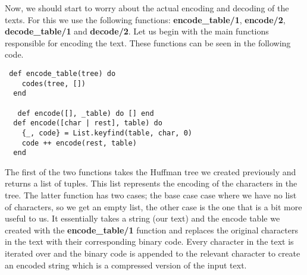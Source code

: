 \documentclass[a4paper,11pt]{article}
\begin{document}
Now, we should start to worry about the actual encoding and decoding of the texts. For this we use the following functions: \textbf{encode\_table/1}, \textbf{encode/2}, \textbf{decode\_table/1} and \textbf{decode/2}. Let us begin with the main functions responsible for encoding the text.
These functions can be seen in the following code.
\begin{verbatim}
 def encode_table(tree) do
    codes(tree, [])
  end
  
   def encode([], _table) do [] end
  def encode([char | rest], table) do
    {_, code} = List.keyfind(table, char, 0)
    code ++ encode(rest, table)
  end
\end{verbatim}
The first of the two functions takes the Huffman tree we created previously and returns a list of tuples. This list represents the encoding of the characters in the tree. The latter function has two cases; the base case case where we have no list of characters, so we get an empty list, the other case is the one that is a bit more useful to us. It essentially takes a string (our text) and the encode table we created with the \textbf{encode\_table/1} function and replaces the original characters in the text with their corresponding binary code. Every character in the text is iterated over and the binary code is appended to the relevant character to create an encoded string which is a compressed version of the input text.\\
\end{document}
